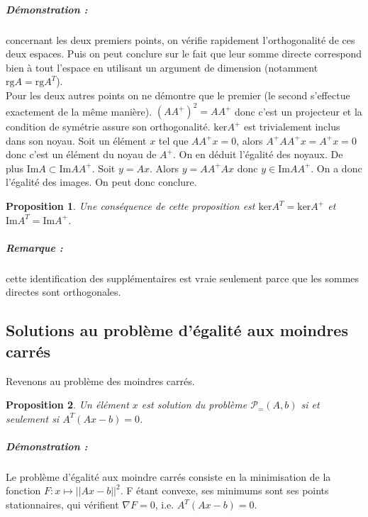 \documentclass[10pt,a4paper]{article}
\newtheorem{prop}{Proposition}
\begin{document}
\subparagraph{Démonstration :} concernant les deux premiers points, on vérifie rapidement l'orthogonalité de ces deux espaces.
Puis on peut conclure sur le fait que leur somme directe correspond bien à tout l'espace en utilisant un argument de dimension (notamment $\text{rg}A=\text{rg}A^T$).\\
Pour les deux autres points on ne démontre que le premier (le second s'effectue exactement de la même manière). $(AA^+)^2=AA^+$ donc c'est un projecteur et la condition de symétrie assure son orthogonalité. $\text{ker}A^+$ est trivialement inclus dans son noyau.
Soit un élément $x$ tel que $AA^+x=0$, alors $A^+AA^+x=A^+x=0$ donc c'est un élément du noyau de $A^+$.
On en déduit l'égalité des noyaux.
De plus $\text{Im}A \subset \text{Im}AA^+$.
Soit $y=Ax$.
Alors $y=AA^+Ax$ donc $y \in \text{Im}AA^+$.
On a donc l'égalité des images.
On peut donc conclure.
\begin{prop}
Une conséquence de cette proposition est $\text{ker}A^T=\text{ker}A^+$ et $\text{Im}A^T=\text{Im}A^+$.
\end{prop}
\subparagraph{Remarque :} cette identification des supplémentaires est vraie seulement parce que les sommes directes sont orthogonales.\\

\subsection{Solutions au problème d'égalité aux moindres carrés}

Revenons au problème des moindres carrés.
\begin{prop}
  Un élément $x$ est solution du problème $\mathcal{P}_{=}(A, b)$ si et seulement si $A^T(Ax-b)=0$.
\end{prop}
\subparagraph{Démonstration :}
Le problème d'égalité aux moindre carrés consiste en la minimisation de la fonction $F: x \mapsto ||Ax - b||^2$.
F étant convexe, ses minimums sont ses points stationnaires, qui vérifient $\nabla F = 0$, i.e. $A^T(Ax - b) = 0$.
\end{document}
